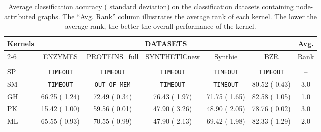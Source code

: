 \documentclass[twoside,11pt]{article}
\begin{document}
\begin{table}[t]
\centering
\scriptsize
\begin{sc}
\def\arraystretch{1.1}
\begin{tabular}{lcccccc} \hline
\multirow{3}{*}{Kernels} & \multicolumn{5}{c}{DATASETS} & \multirow{2}{*}{Avg.} \\ \cline{2-6}
& \multirow{2}{*}{ENZYMES} & \multirow{2}{*}{PROTEINS\_full} & \multirow{2}{*}{SYNTHETICnew} & \multirow{2}{*}{Synthie} & \multirow{2}{*}{BZR} & \multirow{2}{*}{Rank} \\ 
& & & & & \\ \hline
SP & \texttt{TIMEOUT} & \texttt{TIMEOUT} & \texttt{TIMEOUT} & \texttt{TIMEOUT} & \texttt{TIMEOUT} & -- \\
SM & \texttt{TIMEOUT} & \texttt{OUT-OF-MEM} & \texttt{TIMEOUT} & \texttt{TIMEOUT} & 80.52 {\tiny ( 0.43)} & 3.0 \\
GH & 66.25 {\tiny ( 1.24)} & 72.49 {\tiny ( 0.34)} & 76.43 {\tiny ( 1.97)} & 71.75 {\tiny ( 1.65)} & 82.58 {\tiny ( 1.05)} & 1.0 \\
PK & 15.42 {\tiny ( 1.00)} & 59.56 {\tiny ( 0.01)} & 47.90 {\tiny ( 3.26)} & 48.90 {\tiny ( 2.05)} & 78.76 {\tiny ( 0.02)} & 3.0 \\
ML & 65.55 {\tiny ( 0.93)} & 70.55 {\tiny ( 0.99)} & 47.90 {\tiny ( 2.13)} & 69.42 {\tiny ( 1.98)} & 82.33 {\tiny ( 1.29)} & 2.0 \\ \hline
\end{tabular}
\end{sc}
\caption{Average classification accuracy ( standard deviation) on the  classification datasets containing node-attributed graphs. The ``Avg. Rank'' column illustrates the average rank of each kernel. The lower the average rank, the better the overall performance of the kernel.}
\label{tab:results_attributed}
\end{table}
\end{document}
